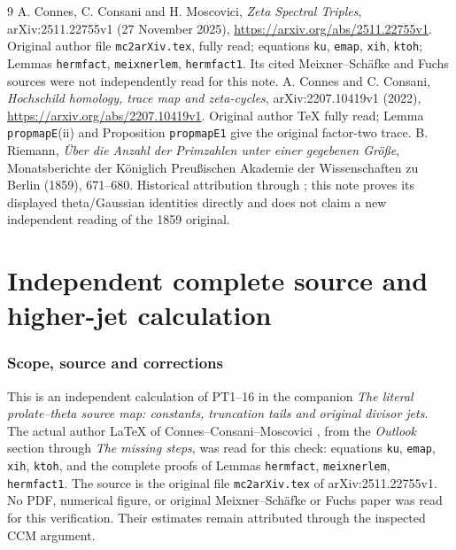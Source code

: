 \begin{thebibliography}{9}
 A. Connes, C. Consani and H. Moscovici,
\emph{Zeta Spectral Triples}, arXiv:2511.22755v1 (27 November 2025),
\url{https://arxiv.org/abs/2511.22755v1}.
Original author file \texttt{mc2arXiv.tex}, fully read;
equations \texttt{ku}, \texttt{emap}, \texttt{xih}, \texttt{ktoh};
Lemmas \texttt{hermfact}, \texttt{meixnerlem}, \texttt{hermfact1}.
Its cited Meixner--Sch\"afke and Fuchs sources were not independently
read for this note.
 A. Connes and C. Consani,
\emph{Hochschild homology, trace map and zeta-cycles},
arXiv:2207.10419v1 (2022),
\url{https://arxiv.org/abs/2207.10419v1}.
Original author TeX fully read; Lemma \texttt{propmapE}(ii) and
Proposition \texttt{propmapE1} give the original factor-two trace.
 B. Riemann,
\emph{\"Uber die Anzahl der Primzahlen unter einer gegebenen Gr\"o\ss e},
Monatsberichte der K\"oniglich Preu\ss ischen Akademie der
Wissenschaften zu Berlin (1859), 671--680.
Historical attribution through \cite{swtheta:CCM}; this note proves its
displayed theta/Gaussian identities directly and does not claim a
new independent reading of the 1859 original.
\end{thebibliography}

\endgroup

\clearpage\begingroup
\part*{Independent complete source and higher-jet calculation}
\newcommand{\swjetsR}{\mathbb R}\newcommand{\swjetsC}{\mathbb C}


\section{Scope, source and corrections}
This is an independent calculation of PT1--16 in the companion
\emph{The literal prolate--theta source map: constants, truncation tails and original divisor jets}.
The actual author LaTeX of Connes--Consani--Moscovici \cite{swjets:CCM},
from the \emph{Outlook} section through \emph{The missing steps},
was read for this check: equations \texttt{ku}, \texttt{emap},
\texttt{xih}, \texttt{ktoh}, and the complete proofs of Lemmas
\texttt{hermfact}, \texttt{meixnerlem}, \texttt{hermfact1}.
The source is the original file \texttt{mc2arXiv.tex} of
arXiv:2511.22755v1. No PDF, numerical figure, or original
Meixner--Sch\"afke or Fuchs paper was read for this verification.
Their estimates remain attributed through the inspected CCM argument.

